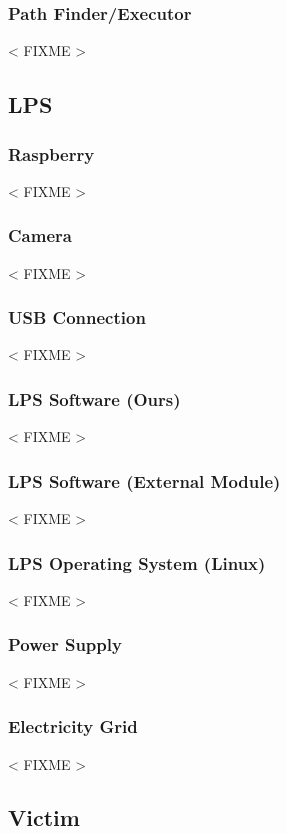 \documentclass[a4paper,parskip,headheight=38pt]{scrartcl} %
\newcommand{\incomplete}[1]{\textless{} #1 \textgreater{}}
\begin{document}
\subsubsection{Path Finder/Executor} %
\incomplete{FIXME}

\subsection{LPS} %

\subsubsection{Raspberry}
\incomplete{FIXME}

\subsubsection{Camera}
\incomplete{FIXME}

\subsubsection{USB Connection}
\incomplete{FIXME}

\subsubsection{LPS Software (Ours)}
\incomplete{FIXME}

\subsubsection{LPS Software (External Module)}
\incomplete{FIXME}

\subsubsection{LPS Operating System (Linux)}
\incomplete{FIXME}

\subsubsection{Power Supply}
\incomplete{FIXME}

\subsubsection{Electricity Grid}
\incomplete{FIXME}

\subsection{Victim} %
\end{document}
